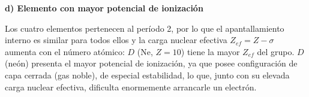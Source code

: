 \begin{exerciseEVAU}
\begin{solu}
        \textbf{d) Elemento con mayor potencial de ionización}

        Los cuatro elementos pertenecen al período 2, por lo que el apantallamiento interno es similar para todos ellos y la carga nuclear efectiva \(Z_{ef} = Z - \sigma\) aumenta con el número atómico: \(D\) (Ne, \(Z=10\)) tiene la mayor \(Z_{ef}\) del grupo. \(D\) (neón) presenta el mayor potencial de ionización, ya que posee configuración de capa cerrada (gas noble), de especial estabilidad, lo que, junto con su elevada carga nuclear efectiva, dificulta enormemente arrancarle un electrón.

    \end{solu}
\end{exerciseEVAU}


